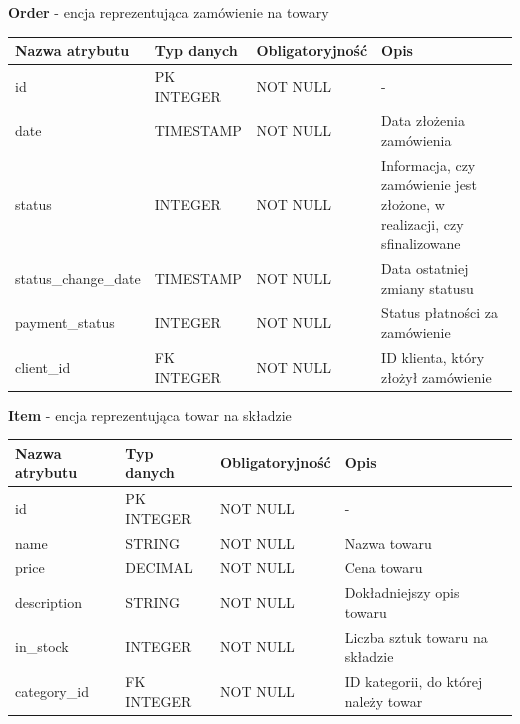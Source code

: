 \documentclass[10pt,a4paper]{article}
\begin{document}
	  \newpage
	  \flushleft \textbf{Order} - encja reprezentująca zamówienie na towary
      \begin{center}
        \begin{tabular}{| m{3cm} | m{3cm} | m{3cm} | m{3cm} |}
          \hline
          Nazwa atrybutu 	   & Typ danych & Obligatoryjność & Opis\\ \hline
		  id 		  	 	   & PK INTEGER & NOT NULL 		  & -\\ \hline
		  date 			 	   & TIMESTAMP  & NOT NULL 		  & Data złożenia zamówienia\\ \hline
		  status 		 	   & INTEGER 	& NOT NULL 		  & Informacja, czy zamówienie jest złożone, 
		  												        w realizacji, czy sfinalizowane\\ \hline
		  status\_change\_date & TIMESTAMP 	& NOT NULL 		  & Data ostatniej zmiany statusu\\ \hline
		  payment\_status 	   & INTEGER 	& NOT NULL 		  & Status płatności za zamówienie\\ \hline
		  client\_id 		   & FK INTEGER & NOT NULL 		  & ID klienta, który złożył zamówienie\\ \hline
		\end{tabular}
	  \end{center}

	  \flushleft \textbf{Item} - encja reprezentująca towar na składzie
      \begin{center}
        \begin{tabular}{| m{3cm} | m{3cm} | m{3cm} |  m{3cm} |}
          \hline
          Nazwa atrybutu & Typ danych & Obligatoryjność & Opis\\ \hline
		  id 			 & PK INTEGER & NOT NULL 		& -\\ \hline
		  name 			 & STRING 	  & NOT NULL 		& Nazwa towaru\\ \hline
		  price 		 & DECIMAL 	  & NOT NULL 		& Cena towaru\\ \hline
		  description 	 & STRING 	  & NOT NULL 		& Dokładniejszy opis towaru\\ \hline
		  in\_stock 	 & INTEGER 	  & NOT NULL 		& Liczba sztuk towaru na składzie\\ \hline
		  category\_id 	 & FK INTEGER & NOT NULL 		& ID kategorii, do której należy towar\\ \hline
		\end{tabular}
	  \end{center}
\end{document}
